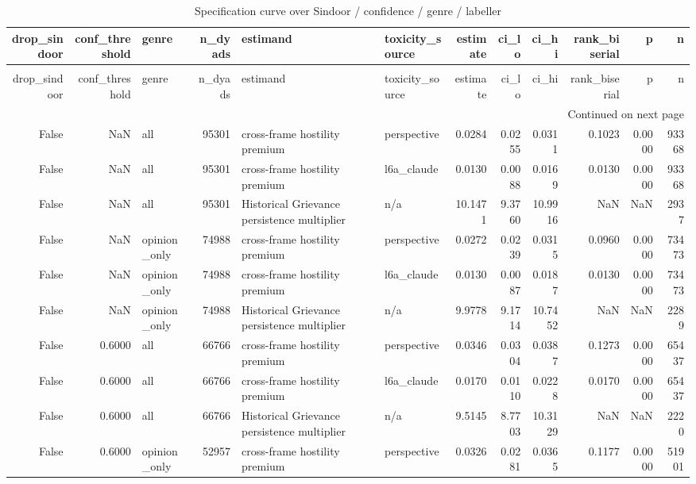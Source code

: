\begin{longtable}{rrlrllrrrrrr}
\caption{Specification curve over Sindoor / confidence / genre / labeller} \label{tab:r1r2_specification_curve} \\
\toprule
drop\_sindoor & conf\_threshold & genre & n\_dyads & estimand & toxicity\_source & estimate & ci\_lo & ci\_hi & rank\_biserial & p & n \\
\midrule
\endfirsthead
\caption[]{Specification curve over Sindoor / confidence / genre / labeller} \\
\toprule
drop\_sindoor & conf\_threshold & genre & n\_dyads & estimand & toxicity\_source & estimate & ci\_lo & ci\_hi & rank\_biserial & p & n \\
\midrule
\endhead
\midrule
\multicolumn{12}{r}{Continued on next page} \\
\midrule
\endfoot
\bottomrule
\endlastfoot
False & NaN & all & 95301 & cross-frame hostility premium & perspective & 0.0284 & 0.0255 & 0.0311 & 0.1023 & 0.0000 & 93368 \\
False & NaN & all & 95301 & cross-frame hostility premium & l6a\_claude & 0.0130 & 0.0088 & 0.0169 & 0.0130 & 0.0000 & 93368 \\
False & NaN & all & 95301 & Historical Grievance persistence multiplier & n/a & 10.1471 & 9.3760 & 10.9916 & NaN & NaN & 2937 \\
False & NaN & opinion\_only & 74988 & cross-frame hostility premium & perspective & 0.0272 & 0.0239 & 0.0315 & 0.0960 & 0.0000 & 73473 \\
False & NaN & opinion\_only & 74988 & cross-frame hostility premium & l6a\_claude & 0.0130 & 0.0087 & 0.0187 & 0.0130 & 0.0000 & 73473 \\
False & NaN & opinion\_only & 74988 & Historical Grievance persistence multiplier & n/a & 9.9778 & 9.1714 & 10.7452 & NaN & NaN & 2289 \\
False & 0.6000 & all & 66766 & cross-frame hostility premium & perspective & 0.0346 & 0.0304 & 0.0387 & 0.1273 & 0.0000 & 65437 \\
False & 0.6000 & all & 66766 & cross-frame hostility premium & l6a\_claude & 0.0170 & 0.0110 & 0.0228 & 0.0170 & 0.0000 & 65437 \\
False & 0.6000 & all & 66766 & Historical Grievance persistence multiplier & n/a & 9.5145 & 8.7703 & 10.3129 & NaN & NaN & 2220 \\
False & 0.6000 & opinion\_only & 52957 & cross-frame hostility premium & perspective & 0.0326 & 0.0281 & 0.0365 & 0.1177 & 0.0000 & 51901 \\

\end{longtable}
